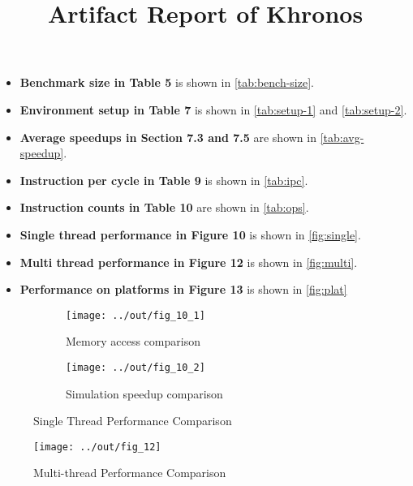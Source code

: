 \documentclass{sig-alternate}
\title{Artifact Report of Khronos}
\begin{document}
\maketitle

\begin{itemize}[noitemsep,topsep=0pt]
  \item {\bf Benchmark size in Table 5} is shown in \autoref{tab:bench-size}.
  \item {\bf Environment setup in Table 7} is shown in \autoref{tab:setup-1} and \autoref{tab:setup-2}.
  \item {\bf Average speedups in Section 7.3 and 7.5} are shown in \autoref{tab:avg-speedup}.
  \item {\bf Instruction per cycle in Table 9} is shown in \autoref{tab:ipc}.
  \item {\bf Instruction counts in Table 10} are shown in \autoref{tab:ops}.
  \item {\bf Single thread performance in Figure 10} is shown in \autoref{fig:single}.
  \item {\bf Multi thread performance in Figure 12} is shown in \autoref{fig:multi}.
  \item {\bf Performance on platforms in Figure 13} is shown in \autoref{fig:plat}
\end{itemize}








\begin{figure*}[h!]
  \centering
  \begin{subfigure}{\linewidth}
    \centering
    \caption{Memory access comparison}
    \texttt{[image: ../out/fig\_10\_1]}
  \end{subfigure}
  \begin{subfigure}{\linewidth}
    \centering
    \caption{Simulation speedup comparison}
    \texttt{[image: ../out/fig\_10\_2]}
  \end{subfigure}
  \vspace*{-5mm}
  \caption{Single Thread Performance Comparison}
  \label{fig:single}
\end{figure*}

\begin{figure*}[h!]
  \centering
  \texttt{[image: ../out/fig\_12]}
  \vspace*{-5mm}
  \caption{Multi-thread Performance Comparison}
  \label{fig:multi}
\end{figure*}
\end{document}

